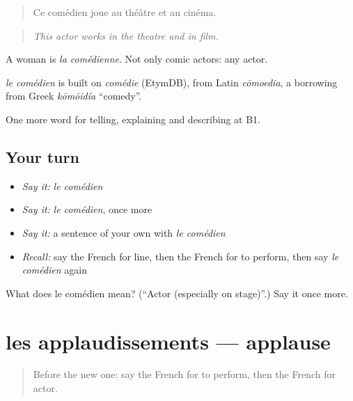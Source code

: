 \begin{quote}
Ce comédien joue au théâtre et au cinéma.
\end{quote}

\begin{quote}
\emph{This actor works in the theatre and in film.}
\end{quote}

A woman is \emph{la comédienne}. Not only comic actors: any actor.

\begin{cousinweb}
\emph{le comédien} is built on \emph{comédie} (EtymDB), from Latin \emph{cōmoedia}, a borrowing from Greek \emph{kōmōidía} \textquotedblleft{}comedy\textquotedblright{}.
\end{cousinweb}

\begin{grammarlens}[title={What you've built}]
One more word for telling, explaining and describing at B1.
\end{grammarlens}

\subsection*{Your turn}
\begin{itemize}
\raggedright
  \item \emph{Say it:} \emph{le comédien}
  \item \emph{Say it:} \emph{le comédien}, once more
  \item \emph{Say it:} a sentence of your own with \emph{le comédien}
  \item \emph{Recall:} say the French for line, then the French for to perform, then say \emph{le comédien} again
\end{itemize}

\begin{tcolorbox}[breakable,colback=teal!4,colframe=teal!35!black,title={Before you move on}]
What does le comédien mean? (\textquotedblleft{}Actor (especially on stage)\textquotedblright{}.) Say it once more.
\end{tcolorbox}
\section[les applaudissements]{les applaudissements — applause}

\label{lesson:FR-C515-applaudissements}



\begin{quote}
Before the new one: say the French for to perform, then the French for actor.
\end{quote}

